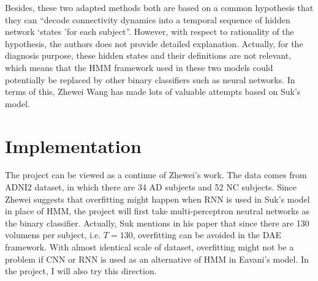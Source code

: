 \documentclass[12pt, oneside]{article}   	%
\begin{document}
\begin{flushleft}
Besides, these two adapted methods both are based on a common hypothesis that they can \textquotedblleft decode connectivity dynamics into a temporal sequence of hidden network \textquoteleft states \textquoteright for each subject\textquotedblright \cite{eavani}. However, with respect to rationality of the hypothesis, the authors does not provide detailed explanation. Actually, for the diagnosis purpose, these hidden states and their definitions are not relevant, which means that the HMM framework used in these two models could potentially be replaced by other binary classifiers such as neural networks. In terms of this, Zhewei Wang has made lots of valuable attempts based on Suk's model.
\end{flushleft}

\section{Implementation}
\begin{flushleft}
The project can be viewed as a continue of Zhewei's work. The data comes from ADNI2 dataset, in which there are 34 AD subjects and 52 NC subjects. Since Zhewei suggests that overfitting might happen when RNN is used in Suk's model in place of HMM, the project will first take multi-perceptron neutral networks as the binary classifier. Actually, Suk mentions in his paper that since there are 130 volumens per subject, i.e. $T=130$, overfitting can be avoided in the DAE framework. With almost identical scale of dataset, overfitting might not be a problem if CNN or RNN is used as an alternative of HMM in Eavani's model. In the project, I will also try this direction.
\end{flushleft}



\end{document}
